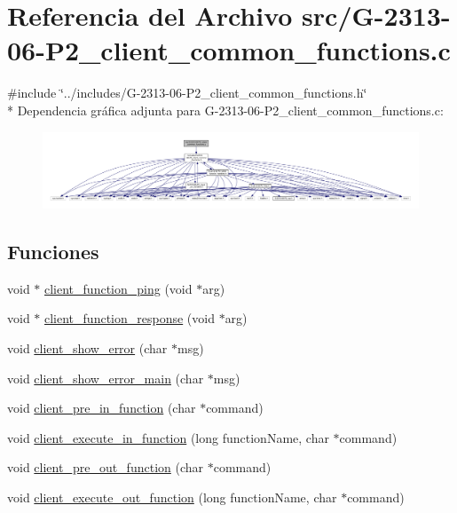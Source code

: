 \hypertarget{G-2313-06-P2__client__common__functions_8c}{}\section{Referencia del Archivo src/\+G-\/2313-\/06-\/\+P2\+\_\+client\+\_\+common\+\_\+functions.c}
\label{G-2313-06-P2__client__common__functions_8c}
{\ttfamily \#include \char`\"{}../includes/\+G-\/2313-\/06-\/\+P2\+\_\+client\+\_\+common\+\_\+functions.\+h\char`\"{}}\\*
Dependencia gráfica adjunta para G-\/2313-\/06-\/\+P2\+\_\+client\+\_\+common\+\_\+functions.c\+:\nopagebreak
\begin{figure}[H]
\begin{center}
\leavevmode
\includegraphics[width=350pt]{G-2313-06-P2__client__common__functions_8c__incl}
\end{center}
\end{figure}
\subsection*{Funciones}
\begin{DoxyCompactItemize}
\item 
void $\ast$ \hyperlink{G-2313-06-P2__client__common__functions_8c_a7297f848d5b0bd4990857d03cf3111e4}{client\+\_\+function\+\_\+ping} (void $\ast$arg)
\item 
void $\ast$ \hyperlink{G-2313-06-P2__client__common__functions_8c_afbd2dc7b3224fc3d2c5c9233b307c376}{client\+\_\+function\+\_\+response} (void $\ast$arg)
\item 
void \hyperlink{G-2313-06-P2__client__common__functions_8c_a03942275c5a503be4f7288cda71fb139}{client\+\_\+show\+\_\+error} (char $\ast$msg)
\item 
void \hyperlink{G-2313-06-P2__client__common__functions_8c_aa1f1dfdb0122f771b6c56edab7bc3613}{client\+\_\+show\+\_\+error\+\_\+main} (char $\ast$msg)
\item 
void \hyperlink{G-2313-06-P2__client__common__functions_8c_aa74c686c447b275e6a8cf36419033e81}{client\+\_\+pre\+\_\+in\+\_\+function} (char $\ast$command)
\item 
void \hyperlink{G-2313-06-P2__client__common__functions_8c_a6dd72e0b56b87f85d8cac2a30066198b}{client\+\_\+execute\+\_\+in\+\_\+function} (long function\+Name, char $\ast$command)
\item 
void \hyperlink{G-2313-06-P2__client__common__functions_8c_a68019fe1e0edcc71bb3dadeb70a86dcd}{client\+\_\+pre\+\_\+out\+\_\+function} (char $\ast$command)
\item 
void \hyperlink{G-2313-06-P2__client__common__functions_8c_a26512d35b24fec46c8fa4c803dc00867}{client\+\_\+execute\+\_\+out\+\_\+function} (long function\+Name, char $\ast$command)
\end{DoxyCompactItemize}

